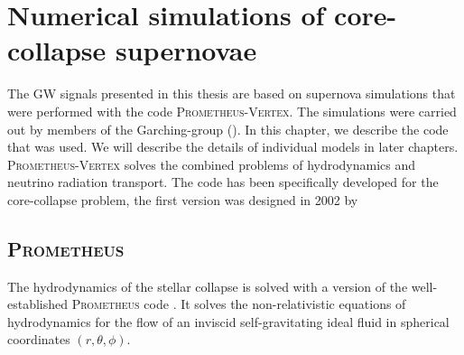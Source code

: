 
\chapter{Numerical simulations of core-collapse supernovae} \label{ch:numerics}
The GW signals presented in this thesis are based on 
supernova simulations that were performed with the code \textsc{Prometheus-Vertex}.
The simulations were carried out by members of the Garching-group 
(\cite{hanke_phd,melson_phd,suma_models}).
In this chapter, we describe the code that was used. We will
describe the details of individual models in later chapters. 
\textsc{Prometheus-Vertex} solves the combined problems of hydrodynamics and neutrino radiation transport.
The code has been specifically developed for the core-collapse problem,
the first version was designed in 2002 by \cite{rampp_02} 

\section{\textsc{Prometheus}}
The hydrodynamics of the stellar collapse is solved with a version of the
well-established \textsc{Prometheus} code \citep{mueller_91,fryxell_91}. It solves the non-relativistic 
equations of hydrodynamics for the flow of an inviscid self-gravitating ideal fluid in spherical coordinates $(r,\theta,\phi)$.
